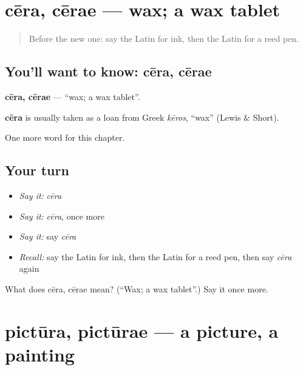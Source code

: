 \section[cēra, cērae]{cēra, cērae — wax; a wax tablet}

\label{lesson:LA-C124-cera}



\begin{quote}
Before the new one: say the Latin for ink, then the Latin for a reed pen.
\end{quote}

\subsection*{You'll want to know: cēra, cērae}
\textbf{cēra, cērae} — \textquotedblleft{}wax; a wax tablet\textquotedblright{}.

\begin{cousinweb}
\textbf{cēra} is usually taken as a loan from Greek \emph{kēros}, \textquotedblleft{}wax\textquotedblright{} (Lewis \& Short).
\end{cousinweb}

\begin{grammarlens}[title={What you've built}]
One more word for this chapter.
\end{grammarlens}

\subsection*{Your turn}
\begin{itemize}
\raggedright
  \item \emph{Say it:} \emph{cēra}
  \item \emph{Say it:} \emph{cēra}, once more
  \item \emph{Say it:} say \emph{cēra}
  \item \emph{Recall:} say the Latin for ink, then the Latin for a reed pen, then say \emph{cēra} again
\end{itemize}

\begin{tcolorbox}[breakable,colback=teal!4,colframe=teal!35!black,title={Before you move on}]
What does cēra, cērae mean? (\textquotedblleft{}Wax; a wax tablet\textquotedblright{}.) Say it once more.
\end{tcolorbox}
\section[pictūra, pictūrae]{pictūra, pictūrae — a picture, a painting}


